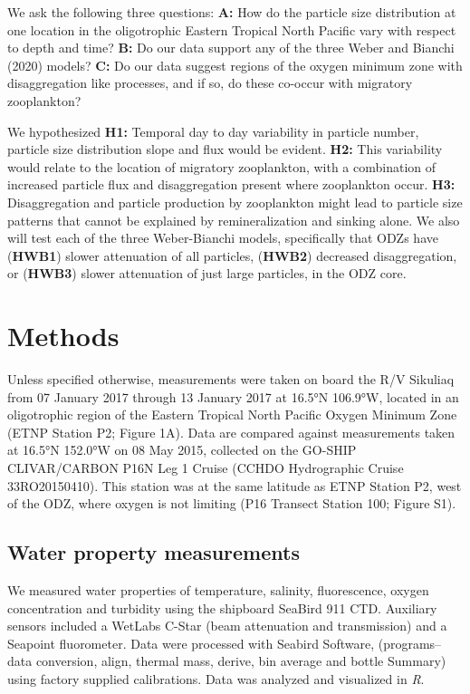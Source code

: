 \documentclass[]{article}
\begin{document}
We ask the following three questions: \textbf{A:} How do the particle
size distribution at one location in the oligotrophic Eastern Tropical
North Pacific vary with respect to depth and time? \textbf{B:} Do our
data support any of the three Weber and Bianchi (2020) models?
\textbf{C:} Do our data suggest regions of the oxygen minimum zone with
disaggregation like processes, and if so, do these co-occur with
migratory zooplankton?

We hypothesized \textbf{H1:} Temporal day to day variability in particle
number, particle size distribution slope and flux would be evident.
\textbf{H2:} This variability would relate to the location of migratory
zooplankton, with a combination of increased particle flux and
disaggregation present where zooplankton occur. \textbf{H3:}
Disaggregation and particle production by zooplankton might lead to
particle size patterns that cannot be explained by remineralization and
sinking alone. We also will test each of the three Weber-Bianchi models,
specifically that ODZs have (\textbf{HWB1}) slower attenuation of all
particles, (\textbf{HWB2}) decreased disaggregation, or (\textbf{HWB3})
slower attenuation of just large particles, in the ODZ core.

\hypertarget{methods}{%
\section{Methods}\label{methods}}

Unless specified otherwise, measurements were taken on board the R/V
Sikuliaq from 07 January 2017 through 13 January 2017 at 16.5°N 106.9°W,
located in an oligotrophic region of the Eastern Tropical North Pacific
Oxygen Minimum Zone (ETNP Station P2; Figure 1A). Data are compared
against measurements taken at 16.5°N 152.0°W on 08 May 2015, collected
on the GO-SHIP CLIVAR/CARBON P16N Leg 1 Cruise (CCHDO Hydrographic
Cruise 33RO20150410). This station was at the same latitude as ETNP
Station P2, west of the ODZ, where oxygen is not limiting (P16 Transect
Station 100; Figure S1).

\hypertarget{water-property-measurements}{%
\subsection{Water property
measurements}\label{water-property-measurements}}

We measured water properties of temperature, salinity, fluorescence,
oxygen concentration and turbidity using the shipboard SeaBird 911 CTD.
Auxiliary sensors included a WetLabs C-Star (beam attenuation and
transmission) and a Seapoint fluorometer. Data were processed with
Seabird Software, (programs--data conversion, align, thermal mass,
derive, bin average and bottle Summary) using factory supplied
calibrations. Data was analyzed and visualized in \emph{R}.
\end{document}

